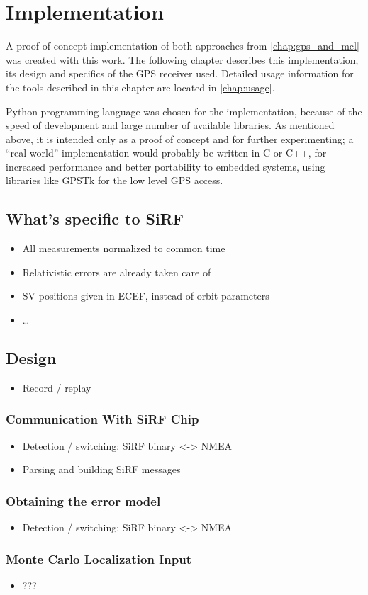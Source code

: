 \chapter{Implementation}
\label{chap:implementation}

A proof of concept implementation of both approaches from \cref{chap:gps_and_mcl}
was created with this work.
The following chapter describes this implementation, its design and
specifics of the GPS receiver used.
Detailed usage information for the tools described in this chapter are located in
\cref{chap:usage}.

Python programming language was chosen for the implementation,
because of the speed of development and large number of available libraries.
As mentioned above, it is intended only as a proof of
concept and for further experimenting; a \enquote{real world} implementation
would probably be written in C or C++, for increased performance and better portability
to embedded systems, using libraries like GPSTk \cite{tolman04} for the low level GPS access.

\section{What's specific to SiRF}
\label{sec:impl-sirf}
\begin{itemize}
\item All measurements normalized to common time
\item Relativistic errors are already taken care of
\item SV positions given in ECEF, instead of orbit parameters
\item \ldots
\end{itemize}

\section{Design}
\begin{itemize}
\item Record / replay
\end{itemize}

\subsection{Communication With SiRF Chip}
\begin{itemize}
\item Detection / switching: SiRF binary <-> NMEA
\item Parsing and building SiRF messages
\end{itemize}

\subsection{Obtaining the error model}
\begin{itemize}
\item Detection / switching: SiRF binary <-> NMEA
\end{itemize}

\subsection{Monte Carlo Localization Input}
\begin{itemize}
\item ???
\end{itemize}

